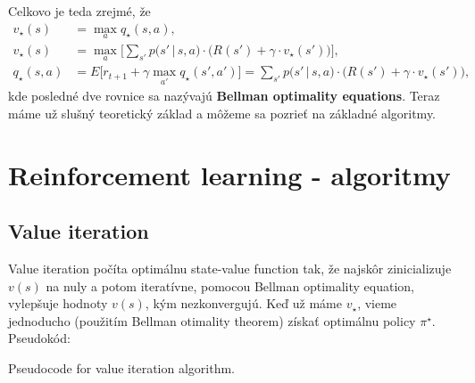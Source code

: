 \documentclass[letterpaper,12pt]{article}
\begin{document}
\noindent Celkovo je teda zrejmé, že
\begin{align*}
v_\star (s) &= \max\limits_{a} q_\star (s,a),\\
v_\star (s) &= \max\limits_{a} \Big[\sum\limits_{s'} p\big(s'\,|\,s, a\big) \cdot \big(R(s') + \gamma \cdot v_\star (s')\big)\Big],\\ 
q_\star(s,a) &= E\Big[r_{t+1} + \gamma \max\limits_{a'} q_\star(s',a')\Big] = \sum\limits_{s'} p\big(s'\,|\,s, a\big) \cdot \big(R(s') + \gamma \cdot v_\star (s')\big),
\end{align*}
kde posledné dve rovnice sa nazývajú \textbf{Bellman optimality equations}. Teraz máme už slušný teoretický základ a môžeme sa pozrieť na základné algoritmy.


\section{Reinforcement learning - algoritmy}
\subsection{Value iteration}

\indent\par Value iteration počíta optimálnu state-value function tak, že najskôr zinicializuje $v(s)$ na nuly a potom iteratívne, pomocou Bellman optimality equation, vylepšuje hodnoty $v(s)$, kým nezkonvergujú. Keď už máme $v_\star$, vieme jednoducho (použitím Bellman otimality theorem) získať optimálnu policy $\pi^\star$. Pseudokód:

\vspace{0.3cm}
\begin{algorithm}[H]
\noindent{}
\vspace{0.4cm}
\caption{Pseudocode for value iteration algorithm.}
\end{algorithm}
\vspace{0.3cm}
\end{document}

